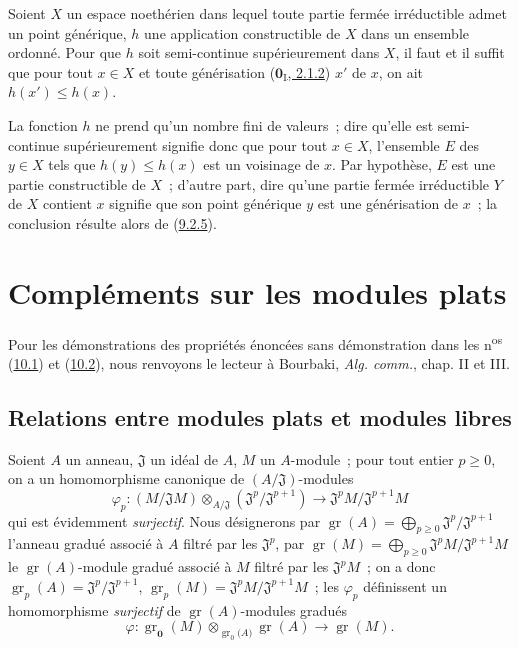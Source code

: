 \begin{proposition}[9.3.4]
\label{0.9.3.4-fr}
Soient $X$ un espace noethérien dans lequel toute partie fermée irréductible
admet un point générique, $h$ une application constructible de $X$ dans un
ensemble ordonné. Pour que $h$ soit semi-continue supérieurement dans $X$,
il faut et il suffit que pour tout $x\in X$ et toute générisation
\textup{(\hyperref[0.2.1.2-fr]{$\mathbf{0}_{\mathrm I}$, 2.1.2})} $x'$ de $x$, on ait
$h(x')\leq h(x)$.
\end{proposition}

La fonction $h$ ne prend qu'un nombre fini de valeurs~; dire qu'elle est
semi-continue supérieurement signifie donc que pour tout $x\in X$,
l'ensemble $E$ des $y\in X$ tels que $h(y)\leq h(x)$ est un voisinage de $x$.
Par hypothèse, $E$ est une partie constructible de $X$~; d'autre part, dire
qu'une partie fermée irréductible $Y$ de $X$ contient $x$ signifie que son
point générique $y$ est une générisation de $x$~; la conclusion résulte
alors de (\hyperref[0.9.2.5-fr]{9.2.5}).

\section{Compléments sur les modules plats}
\label{section:0.10-fr}

Pour les démonstrations des propriétés énoncées sans démonstration dans les
n\textsuperscript{os} (\hyperref[subsection:0.10.1-fr]{10.1}) et
(\hyperref[subsection:0.10.2-fr]{10.2}), nous renvoyons le lecteur à Bourbaki,
\emph{Alg. comm.}, chap. II et III.

\subsection{Relations entre modules plats et modules libres}
\label{subsection:0.10.1-fr}

\begin{env}[10.1.1]
\label{0.10.1.1-fr}
Soient $A$ un anneau, $\mathfrak{J}$ un idéal de $A$, $M$ un $A$-module~; pour
tout entier $p\geq0$, on a un homomorphisme canonique de
$(A/\mathfrak{J})$-modules
\[
\label{0.10.1.1.1-fr}
  \varphi_p:(M/\mathfrak{J}M)\otimes_{A/\mathfrak{J}}
  (\mathfrak{J}^p/\mathfrak{J}^{p+1})
  \longrightarrow \mathfrak{J}^pM/\mathfrak{J}^{p+1}M
  \tag{10.1.1.1}
\]
qui est évidemment \emph{surjectif}. Nous désignerons par
$\operatorname{gr}(A)=\bigoplus_{p\geq0}\mathfrak{J}^p/\mathfrak{J}^{p+1}$ l'anneau gradué
associé à $A$ filtré par les $\mathfrak{J}^p$, par
$\operatorname{gr}(M)=\bigoplus_{p\geq0}\mathfrak{J}^pM/\mathfrak{J}^{p+1}M$ le
$\operatorname{gr}(A)$-module gradué associé à $M$ filtré par les $\mathfrak{J}^pM$~; on a
donc $\operatorname{gr}_p(A)=\mathfrak{J}^p/\mathfrak{J}^{p+1}$,
$\operatorname{gr}_p(M)=\mathfrak{J}^pM/\mathfrak{J}^{p+1}M$~; les $\varphi_p$ définissent
un homomorphisme \emph{surjectif} de $\operatorname{gr}(A)$-modules gradués
\[
\label{0.10.1.1.2-fr}
  \varphi:\operatorname{gr}_{\mathbf{0}}(M)\otimes_{\operatorname{gr}_0(A\boldsymbol{)}}
  \operatorname{gr}(A)\longrightarrow\operatorname{gr}(M).
  \tag{10.1.1.2}
\]
\end{env}

